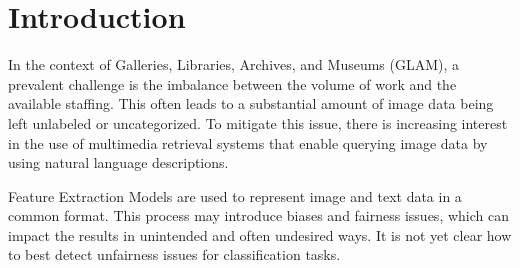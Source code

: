 \documentclass[12pt,a4paper,titlepage,oneside,english]{article}
\begin{document}
\section{Introduction}



In the context of Galleries, Libraries, Archives, and Museums (GLAM), a prevalent challenge is the imbalance between the volume of work and the available staffing. This often leads to a substantial amount of image data being left unlabeled or uncategorized. To mitigate this issue, there is increasing interest in the use of multimedia retrieval systems that enable querying image data by using natural language descriptions. 


Feature Extraction Models are used to represent image and text data in a common format. This process may introduce biases and fairness issues, which can impact the results in unintended and often undesired ways. It is not yet clear how to best detect unfairness issues for classification tasks.

\end{document}
